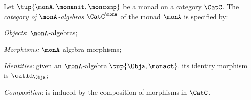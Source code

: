 \begin{ctdefinition}
    \label{def:catofmonadalgebras}
Let $\tup{\monA, \monunit, \moncomp}$ be a monad on a category $\CatC$. The \emph{category of $\monA$-algebras} $\CatC^\monA$ of the monad $\monA$ is specified by:
\begin{compactenum}
\item \emph{Objects}: $\monA$-algebras;
\item \emph{Morphisms:} $\monA$-algebra morphisms;
\item \emph{Identities}: given an $\monA$-algebra $\tup{\Obja, \monact}$, its identity morphism is $\catid_\Obja$;
\item \emph{Composition}: is induced by the composition of morphisms in $\CatC$.
\end{compactenum}
\end{ctdefinition}


